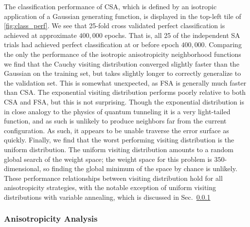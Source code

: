 \documentclass[11pt]{afthesis}
\begin{document}
	The classification performance of CSA, which is defined by an isotropic application of a Gaussian generating function, is displayed in the top-left tile of \ref{fig:class_perf}. We see that 25-fold cross validated perfect classification is achieved at approximate $400,000$ epochs. That is, all 25 of the independent SA trials had achieved perfect classification at or before epoch $400,000$. Comparing the only the performance of the isotropic anisotropicity neighborhood functions we find that the Cauchy visiting distribution converged slightly faster than the Gaussian on the training set, but takes slightly longer to correctly generalize to the validation set. This is somewhat unexpected, as FSA is generally much faster than CSA. The exponential visiting distribution performs poorly relative to both CSA and FSA, but this is not surprising. Though the exponential distribution is in close analogy to the physics of quantum tunneling it is a very light-tailed function, and as such is unlikely to produce neighbors far from the current configuration. As such, it appears to be unable traverse the error surface as quickly. Finally, we find that the worst performing visiting distribution is the uniform distribution. The uniform visiting distribution amounts to a random global search of the weight space; the weight space for this problem is $350$-dimensional, so finding the global minimum of the space by chance is unlikely. These performance relationships between visiting distribution hold for all anisotropicity strategies, with the notable exception of uniform visiting distributions with variable annealing, which is discussed in Sec.~\ref{scn:anisotropicity_analysis}
	
	\subsubsection{Anisotropicity Analysis}
	\label{scn:anisotropicity_analysis}
	
\end{document}
